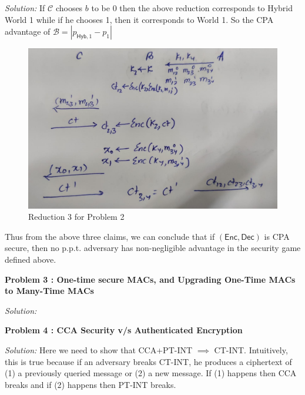 \documentclass[a4paper, 11pt]{article}
\newenvironment{solution}
    {\textit{Solution:}}
    {\clearpage}
\newcommand{\prob}[1]{\begin{mdframed}[backgroundcolor=gray!20] \textbf{Problem #1}\end{mdframed}}
\newcommand{\hyb}{\mathsf{Hyb}}
\newcommand{\enc}{\mathsf{Enc}}
\newcommand{\dec}{\mathsf{Dec}}
\newcommand{\calB}{\mathcal{B}}
\newcommand{\calC}{\mathcal{C}}
\begin{document}
\begin{solution}
    If $\calC$ chooses $b$ to be 0 then the above reduction corresponds to Hybrid World 1  while if he chooses 1, then it corresponds to World 1. So the CPA advantage of $\calB=|p_{\hyb,1}-p_{1}|$

    \begin{figure}[!ht]
        \centering
        \includegraphics[scale=0.25]{images/Reduction23.jpg}
        \caption{Reduction 3 for Problem 2}
        \label{fig:p23}
    \end{figure}

    Thus from the above three claims, we can conclude that if $(\enc,\dec)$ is CPA secure, then no p.p.t. adversary has non-negligible advantage in the security game defined above.
\end{solution}

\prob{3 : One-time secure MACs, and Upgrading One-Time MACs to Many-Time MACs}
\begin{solution}

\end{solution}


\prob{4 : CCA Security v/s Authenticated Encryption}
\begin{solution}
    Here we need to show that CCA+PT-INT $\implies$ CT-INT. Intuitively, this is true because if an adversary breaks CT-INT, he produces a ciphertext of (1) a previously queried message or (2) a new message.
    If (1) happens then CCA breaks and if (2) happens then PT-INT breaks.
\end{solution}
\end{document}
